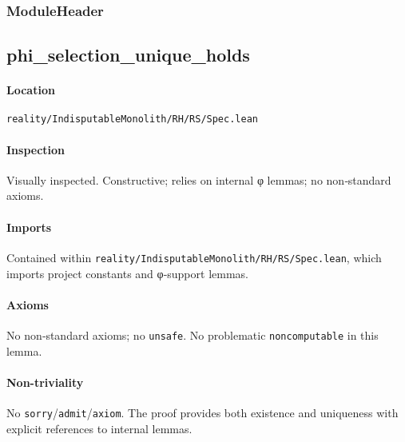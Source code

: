\documentclass{article}
\newcommand{\FileRef}[1]{\texttt{#1}}
\newcommand{\ModuleHeader}[3]{%
  \subsection{#1}
  \paragraph{Location} \FileRef{#2}\\
  \paragraph{Inspection} #3
}
\begin{document}
\subsubsection{ModuleHeader}
\ModuleHeader{phi\_selection\_unique\_holds}{reality/IndisputableMonolith/RH/RS/Spec.lean}{Visually inspected. Constructive; relies on internal φ lemmas; no non‑standard axioms.}

\paragraph{Imports}
Contained within \FileRef{reality/IndisputableMonolith/RH/RS/Spec.lean}, which imports project constants and φ‑support lemmas.

\paragraph{Axioms}
No non‑standard axioms; no \texttt{unsafe}. No problematic \texttt{noncomputable} in this lemma.

\paragraph{Non-triviality}
No \texttt{sorry}/\texttt{admit}/\texttt{axiom}. The proof provides both existence and uniqueness with explicit references to internal lemmas.
\end{document}
